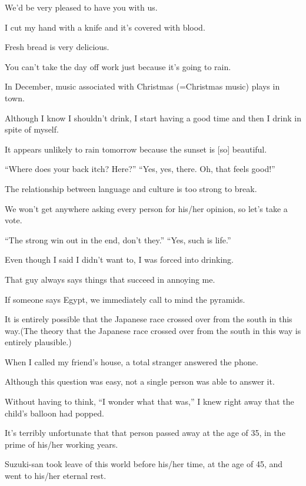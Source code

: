 \item[65.] We'd be very pleased to have you with us.
\item[66.] I cut my hand with a knife and it's covered with blood.
\item[67.] Fresh bread is very delicious.
\item[68.] You can't take the day off work just because it's going to rain.
\item[69.] In December, music associated with Christmas (=Christmas music) plays in town.
\item[70.] Although I know I shouldn't drink, I start having a good time and then I drink in spite of myself.
\item[71.] It appears unlikely to rain tomorrow because the sunset is [so] beautiful.
\item[72.] ``Where does your back itch?  Here?'' ``Yes, yes, there. Oh, that feels good!''
\item[73.] The relationship between language and culture is too strong to break.
\item[74.] We won't get anywhere asking every person for his/her opinion, so let's take a vote.
\item[75.] ``The strong win out in the end, don't they.'' ``Yes, such is life.''
\item[76.] Even though I said I didn't want to, I was forced into drinking.
\item[77.] That guy always says things that succeed in annoying me.
\item[78.] If someone says Egypt, we immediately call to mind the pyramids.
\item[79.] It is entirely possible that the Japanese race crossed over from the south in this way.(The theory that the Japanese race crossed over from the south in this way is entirely plausible.)
\item[80.] When I called my friend's house, a total stranger answered the phone.
\item[81.] Although this question was easy, not a single person was able to answer it.
\item[82.] Without having to think, ``I wonder what that was,'' I knew right away that the child's balloon had popped.
\item[83.] It's terribly unfortunate that that person passed away at the age of 35, in the prime of his/her working years.
\item[84.] Suzuki-san took leave of this world before his/her time, at the age of 45, and went to his/her eternal rest.
